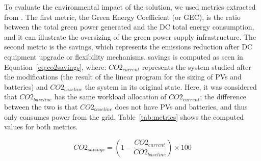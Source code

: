 


To evaluate the environmental impact of the solution, we used metrics extracted from \cite{reddy2017_metrics}. The first metric, the Green Energy Coefficient (or GEC), is the ratio between the total green power generated and the DC total energy consumption, and it can illustrate the oversizing of the green power supply infrastructure. The second metric is the  savings, which represents the emissions reduction after DC equipment upgrade or flexibility mechanisms.  savings is computed as seen in Equation~\ref{eq:co2savings}, where: $CO2_{current}$ represents the system studied after the modifications (the result of the linear program for the sizing of PVs and batteries) and $CO2_{baseline}$ the system in its original state. Here, it was considered that $CO2_{baseline}$ has the same workload allocation of  $CO2_{current}$; the difference between the two is that  $CO2_{baseline}$ does not have PVs and batteries, and thus only consumes power from the grid. Table~\ref{tab:metrics} shows the computed values for both metrics. 






\begin{equation} \label{eq:co2savings}
  CO2_{savings} = \left( 1 -  \frac{CO2_{current}} {CO2_{baseline}} \right) \times 100 
\end {equation}



